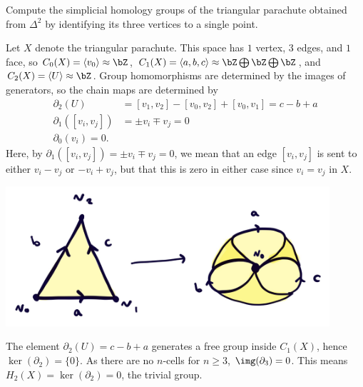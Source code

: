 \begin{homework}[e]
  \prob[2.1.4] Compute the simplicial homology groups of the triangular parachute obtained from $\Delta^2$ by identifying its three vertices to a single point.
\begin{prf}
  
  Let $X$ denote the triangular parachute. This space has $1$ vertex, $3$ edges, and $1$ face, so $C_0(X) = \langle v_0\rangle \approx \bZ$, $C_1(X) = \langle a,b,c\rangle \approx \bZ \bigoplus \bZ \bigoplus \bZ$, and $C_2(X) = \langle U \rangle \approx \bZ$. Group homomorphisms are determined by the images of generators, so the chain maps are determined by
  \begin{align*}
    \partial_2(U) &= [v_1,v_2] - [v_0,v_2] + [v_0,v_1] = c - b + a \\
    \partial_1([v_i,v_j]) &= \pm v_i \mp v_j = 0 \\
    \partial_0(v_i) = 0. 
  \end{align*}
  Here, by $\partial_1([v_i,v_j]) = \pm v_i \mp v_j = 0$, we mean that an edge $[v_i,v_j]$ is sent to either $v_i - v_j$ or $-v_i + v_j$, but that this is zero in either case since $v_i = v_j$ in $X$.
  \begin{center}
    \includegraphics[width=12cm]{figures/hwk8-fig1.png}
    \label{fig:prob1-1}
  \end{center}
  The element $\partial_2(U) = c - b + a$ generates a free group inside $C_1(X)$, hence $\ker(\partial_2) = \{0\}$. As there are no $n$-cells for $n\geq 3$, $\img(\partial_3) = 0$. This means $H_2(X) = \ker(\partial_2) = 0$, the trivial group.


\end{prf}
\end{homework}
